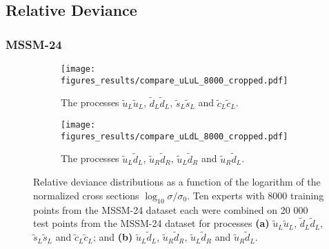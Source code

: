 \documentclass[twoside,english]{uiofysmaster}
\begin{document}
\subsection{Relative Deviance}\label{Sec:: results : Relative Deviance}

\subsubsection{MSSM-24}

\begin{figure}
    \centering
    \begin{subfigure}[b]{0.9\textwidth}
        \texttt{[image: figures\_results/compare\_uLuL\_8000\_cropped.pdf]}
        \caption{The processes $\widetilde{u}_L \widetilde{u}_L$, $\widetilde{d}_L \widetilde{d}_L$, $\widetilde{s}_L \widetilde{s}_L$ and $\widetilde{c}_L \widetilde{c}_L$.}
        \label{Fig:: results : RD MSSM-24 uLuL}
    \end{subfigure}
    \begin{subfigure}[b]{0.9\textwidth}
        \texttt{[image: figures\_results/compare\_uLdL\_8000\_cropped.pdf]}
        \caption{The processes $\widetilde{u}_L\widetilde{d}_L$, $\widetilde{u}_R\widetilde{d}_R$, $\widetilde{u}_L\widetilde{d}_R$ and $\widetilde{u}_R\widetilde{d}_L$.}
        \label{Fig :: results : RD MSSM-24 uLdL}
    \end{subfigure}
    \caption{Relative deviance distributions as a function of the logarithm of the normalized cross sections $\log_{10} \sigma / \sigma_0$. Ten experts with 8000 training points from the MSSM-24 dataset each were combined on 20 000 test points from the MSSM-24 dataset for processes \textbf{(a)}  $\widetilde{u}_L \widetilde{u}_L$, $\widetilde{d}_L \widetilde{d}_L$, $\widetilde{s}_L \widetilde{s}_L$ and $\widetilde{c}_L \widetilde{c}_L$; and \textbf{(b)} $\widetilde{u}_L\widetilde{d}_L$, $\widetilde{u}_R\widetilde{d}_R$, $\widetilde{u}_L\widetilde{d}_R$ and $\widetilde{u}_R\widetilde{d}_L$. }
\label{Fig:: results : RD MSSM-24}
\end{figure}
\end{document}
